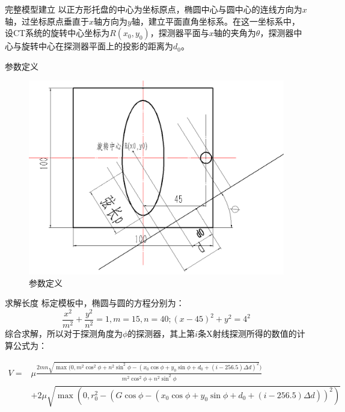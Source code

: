 \documentclass[serif]{beamer} %
\begin{document}
\begin{frame}{完整模型建立}
	以正方形托盘的中心为坐标原点，椭圆中心与圆中心的连线方向为\(x\)轴，过坐标原点垂直于\(x\)轴方向为\(y\)轴，建立平面直角坐标系。在这一坐标系中，设CT系统的旋转中心坐标为\(R(x_0,y_0)\)，探测器平面与\(x\)轴的夹角为\(\theta\)，探测器中心与旋转中心在探测器平面上的投影的距离为\(d_0\)。
	  
\end{frame}



\begin{frame}{参数定义}
	\begin{figure}
		\begin{center}
			\includegraphics[scale=0.3]{pic/q13.png}
		\end{center}
		\caption{参数定义}
		\label{Fig:xian}
	\end{figure}
\end{frame}



\begin{frame}{求解长度}
	标定模板中，椭圆与圆的方程分别为：
	\[\frac{x^2}{m^2} + \frac{y^2}{n^2} = 1,m = 15,n = 40;(x - 45)^2 + y^2 = 4^2\]
	综合求解，所以对于探测角度为\(\phi\)的探测器，其上第\(i\)条X射线探测所得的数值的计算公式为：
	\begin{tiny}
		\begin{align*}\label{va}
			V = & \mu\frac{2mn\sqrt{\max(0,m^2\cos^2\phi + n^2\sin^2\phi - (x_0\cos\phi + y_0\sin\phi + d_0 +  (i - 256.5)\Delta d)^2})}{ m^2\cos^2\phi + n^2\sin^2\phi} \\
			    & + 2\mu\sqrt{\max(0,r_0^2 - (G\cos\phi - (x_0\cos\phi + y_0\sin\phi + d_0 +  (i - 256.5)\Delta d))^2)}                                                  
		\end{align*}
	\end{tiny}
\end{frame}
\end{document}
